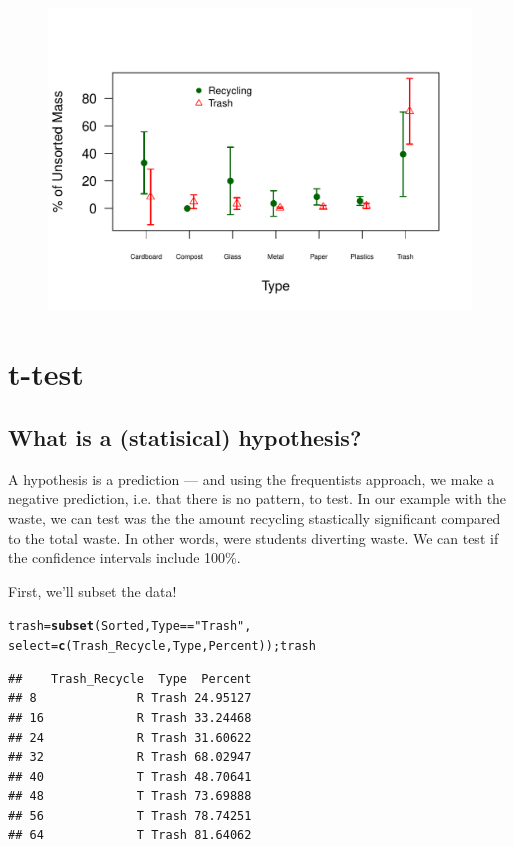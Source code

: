 \documentclass{tufte-handout}\usepackage[]{graphicx}\usepackage[]{color}
\makeatletter
\def\maxwidth{ %
  \ifdim\Gin@nat@width>\linewidth
    \linewidth
  \else
    \Gin@nat@width
  \fi
}
\newcommand{\hlstr}[1]{\textcolor[rgb]{0.192,0.494,0.8}{#1}}%
\newcommand{\hlopt}[1]{\textcolor[rgb]{0,0,0}{#1}}%
\newcommand{\hlstd}[1]{\textcolor[rgb]{0.345,0.345,0.345}{#1}}%
\newcommand{\hlkwb}[1]{\textcolor[rgb]{0.69,0.353,0.396}{#1}}%
\newcommand{\hlkwc}[1]{\textcolor[rgb]{0.333,0.667,0.333}{#1}}%
\newcommand{\hlkwd}[1]{\textcolor[rgb]{0.737,0.353,0.396}{\textbf{#1}}}%
\newenvironment{kframe}{%
 \def\at@end@of@kframe{}%
 \ifinner\ifhmode%
  \def\at@end@of@kframe{\end{minipage}}%
  \begin{minipage}{\columnwidth}%
 \fi\fi%
 \def\FrameCommand##1{\hskip\@totalleftmargin \hskip-\fboxsep
 \colorbox{shadecolor}{##1}\hskip-\fboxsep
     \hskip-\linewidth \hskip-\@totalleftmargin \hskip\columnwidth}%
 \MakeFramed {\advance\hsize-\width
   \@totalleftmargin\z@ \linewidth\hsize
   \@setminipage}}%
 {\par\unskip\endMakeFramed%
 \at@end@of@kframe}
\newenvironment{knitrout}{}{} %
\makeatother
\begin{document}
\begin{figure}
\begin{knitrout}
\begin{kframe}
\begin{alltt}
\end{alltt}
\end{kframe}
\includegraphics[width=\maxwidth]{figure/unnamed-chunk-16-1} 

\end{knitrout}
\end{figure}


\clearpage
\section{t-test}

\subsection{What is a (statisical) hypothesis?}

A hypothesis is a prediction --- and using the frequentists approach, we make a negative prediction, i.e. that there is no pattern, to test. In our example with the waste, we can test was the the amount recycling stastically significant compared to the total waste. In other words, were students diverting waste. We can test if the confidence intervals include 100\%. 

First, we'll subset the data!
\begin{knitrout}
\color{fgcolor}\begin{kframe}
\begin{alltt}
\hlstd{trash} \hlkwb{=} \hlkwd{subset}\hlstd{(Sorted, Type} \hlopt{==} \hlstr{"Trash"}\hlstd{,}
        \hlkwc{select} \hlstd{=} \hlkwd{c}\hlstd{(Trash_Recycle, Type, Percent)); trash}
\end{alltt}
\begin{verbatim}
##    Trash_Recycle  Type  Percent
## 8              R Trash 24.95127
## 16             R Trash 33.24468
## 24             R Trash 31.60622
## 32             R Trash 68.02947
## 40             T Trash 48.70641
## 48             T Trash 73.69888
## 56             T Trash 78.74251
## 64             T Trash 81.64062
\end{verbatim}
\end{kframe}
\end{knitrout}
\end{document}
